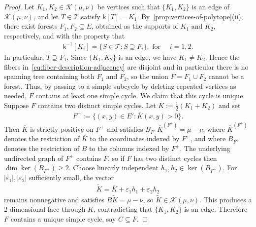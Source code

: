 \documentclass[11pt,a4paper]{article}
\newcommand{\setoftrees}{{\mathcal{T}}}
\newcommand{\embedding}{{\mathsf{k}}}
\newcommand{\flowpoly}{{\mathcal{K}}}
\begin{document}
    \begin{proof}
        Let $K_1, K_2\in\flowpoly(\mu,\nu)$ be vertices such that $\{K_1,K_2\}$ is an edge of $\flowpoly(\mu,\nu)$, and let $T\in\setoftrees$ satisfy $\embedding[T]=K_1$. By~\cref{prop:vertices-of-polytope}(ii), there exist forests $F_1,F_2\subseteq E$, obtained as the supports of $K_1$ and $K_2$, respectively, and with the property that
            \begin{align}\label{eq:fiber-description-adjacency}
                \embedding^{-1}[K_i] = \{S\in\setoftrees: S\supseteq F_i\},\text{ for }\quad i=1,2.
            \end{align}
        In particular, $T\supseteq F_1$. Since $\{K_1,K_2\}$ is an edge, we have $K_1\neq K_2$. Hence the fibers in~\cref{eq:fiber-description-adjacency} are disjoint and in particular there is no spanning tree containing both $F_1$ and $F_2$, so the union $F = F_1\cup F_2$ cannot be a forest. Thus, by passing to a simple subcycle by deleting repeated vertices as needed, $F$ contains at least one simple cycle. We claim that this cycle is unique. Suppose $F$ contains two distinct simple cycles. Let $\overline{K} := \tfrac{1}{2}(K_1+K_2)$ and set
            \begin{align*}
                F^+ := \{(x,y)\in E' : \overline{K}(x,y) > 0\}.
            \end{align*}
        Then $\overline{K}$ is strictly positive on $F^+$ and satisfies $B_{F^+}\overline{K}^{(F^+)} = \mu-\nu$, where $\overline{K}^{(F^+)}$ denotes the restriction of $\overline{K}$ to the coordinates indexed by $F^+$, and where $B_{F^+}$ denotes the restriction of $B$ to the columns indexed by $F^+$. The underlying undirected graph of $F^+$ contains $F$, so if $F$ has two distinct cycles then $\dim\ker(B_{F^+})\ge 2$. Choose linearly independent $h_1,h_2\in\ker(B_{F^+})$. For $|\varepsilon_1|,|\varepsilon_2|$ sufficiently small, the vector
            \begin{align*}
                \widetilde{K} = \overline{K} + \varepsilon_1 h_1 + \varepsilon_2 h_2
            \end{align*}
        remains nonnegative and satisfies $B\widetilde{K} = \mu-\nu$, so $\widetilde{K}\in\flowpoly(\mu,\nu)$. This produces a $2$-dimensional face through $\overline{K}$, contradicting that $\{K_1,K_2\}$ is an edge. Therefore $F$ contains a unique simple cycle, say $C\subseteq F$.
        

\end{proof}
\end{document}
